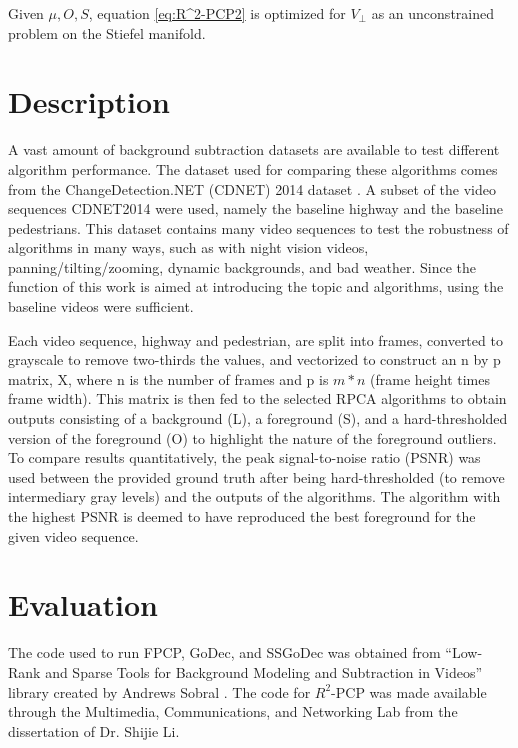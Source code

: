 \documentclass[conference]{IEEEtran}
\begin{document}
Given $\mu, O, S$, equation \ref{eq:R^2-PCP2} is optimized for $V_\perp$ as an unconstrained problem on the Stiefel manifold.


\section{Description}
A vast amount of background subtraction datasets are available to test different algorithm performance. The dataset used for comparing these algorithms comes from the ChangeDetection.NET (CDNET) 2014 dataset \cite{changedetection}. A subset of the video sequences CDNET2014 were used, namely the baseline highway and the baseline pedestrians. This dataset contains many video sequences to test the robustness of algorithms in many ways, such as with night vision videos, panning/tilting/zooming, dynamic backgrounds, and bad weather. Since the function of this work is aimed at introducing the topic and algorithms, using the baseline videos were sufficient. 

Each video sequence, highway and pedestrian, are split into frames, converted to grayscale to remove two-thirds the values, and vectorized to construct an n by p matrix, X, where n is the number of frames and p is $m*n$ (frame height times frame width). This matrix is then fed to the selected RPCA algorithms to obtain outputs consisting of a background (L), a foreground (S), and a hard-thresholded version of the foreground (O) to highlight the nature of the foreground outliers. To compare results quantitatively, the peak signal-to-noise ratio (PSNR) was used between the provided ground truth after being hard-thresholded (to remove intermediary gray levels) and the outputs of the algorithms. The algorithm with the highest PSNR is deemed to have reproduced the best foreground for the given video sequence.



\section{Evaluation}
The code used to run FPCP, GoDec, and SSGoDec was obtained from ``Low-Rank and Sparse Tools for Background Modeling and Subtraction in Videos'' library created by Andrews Sobral \cite{LRSLibrary}. The code for $R^2$-PCP was made available through the Multimedia, Communications, and Networking Lab from the dissertation of Dr. Shijie Li.
\end{document}
